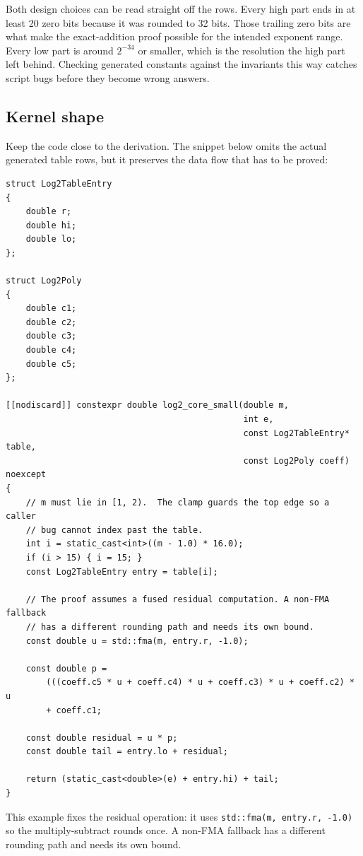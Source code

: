 \documentclass[manuscript, nonacm]{acmart}
\begin{document}
    Both design choices can be read straight off the rows. Every high part
    ends in at least 20 zero bits because it was rounded to 32 bits. Those
    trailing zero bits are what make the exact-addition proof possible for
    the intended exponent range. Every low part is around $2^{-34}$ or
    smaller, which is the resolution the high part left behind. Checking generated constants against the invariants this way
    catches script bugs before they become wrong answers.

    \subsection{Kernel shape}

    Keep the code close to the derivation. The snippet below omits the actual
    generated table rows, but it preserves the data flow that has to be proved:

    \begin{lstlisting}[style=cpp]
struct Log2TableEntry
{
    double r;
    double hi;
    double lo;
};

struct Log2Poly
{
    double c1;
    double c2;
    double c3;
    double c4;
    double c5;
};

[[nodiscard]] constexpr double log2_core_small(double m,
                                               int e,
                                               const Log2TableEntry* table,
                                               const Log2Poly coeff) noexcept
{
    // m must lie in [1, 2).  The clamp guards the top edge so a caller
    // bug cannot index past the table.
    int i = static_cast<int>((m - 1.0) * 16.0);
    if (i > 15) { i = 15; }
    const Log2TableEntry entry = table[i];

    // The proof assumes a fused residual computation. A non-FMA fallback
    // has a different rounding path and needs its own bound.
    const double u = std::fma(m, entry.r, -1.0);

    const double p =
        (((coeff.c5 * u + coeff.c4) * u + coeff.c3) * u + coeff.c2) * u
        + coeff.c1;

    const double residual = u * p;
    const double tail = entry.lo + residual;

    return (static_cast<double>(e) + entry.hi) + tail;
}
    \end{lstlisting}

    This example fixes the residual operation: it uses
    \texttt{std::fma(m, entry.r, -1.0)} so the multiply-subtract rounds once.
    A non-FMA fallback has a different rounding path and needs its own bound.
\end{document}
